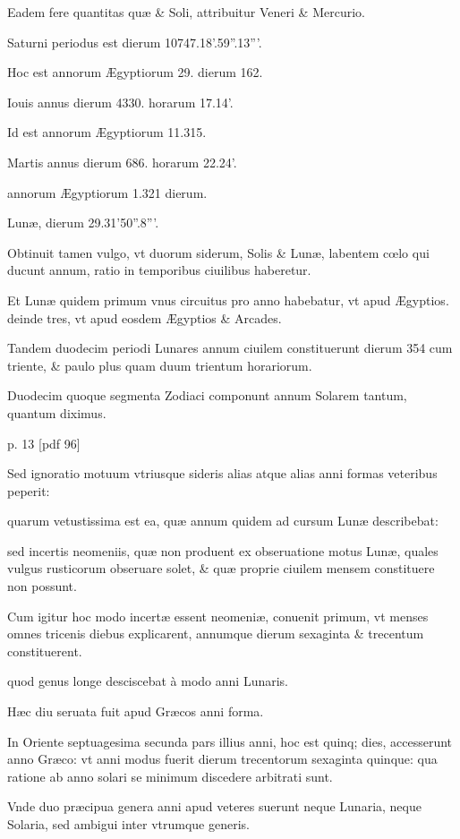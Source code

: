 Eadem fere quantitas quæ \& Soli, attribuitur Veneri \& Mercurio.

Saturni periodus est dierum 10747.18'.59''.13'''.

Hoc est annorum
Ægyptiorum 29. dierum 162.

Iouis annus dierum 4330. horarum 17.14'.

Id est annorum Ægyptiorum 11.315.

Martis annus dierum
686. horarum 22.24'.

annorum Ægyptiorum 1.321 dierum.

Lunæ,
dierum 29.31'50''.8'''.

Obtinuit tamen vulgo, vt duorum siderum,
Solis \& Lunæ, labentem cœlo qui ducunt annum, ratio in  temporibus
ciuilibus haberetur.

Et Lunæ quidem primum vnus circuitus
pro anno habebatur, vt apud Ægyptios. deinde tres, vt apud eosdem
Ægyptios \& Arcades.

Tandem duodecim periodi Lunares annum
ciuilem constituerunt dierum 354 cum triente, \& paulo plus quam
duum trientum horariorum.

Duodecim quoque segmenta Zodiaci
componunt annum Solarem tantum, quantum diximus.



p. 13 [pdf 96]


Sed ignoratio
motuum vtriusque sideris alias atque alias anni formas veteribus
peperit:

quarum vetustissima est ea, quæ annum quidem ad cursum
Lunæ describebat:

sed incertis neomeniis, quæ non produent ex obseruatione
motus Lunæ, quales vulgus rusticorum obseruare solet, \&
quæ proprie ciuilem mensem constituere non possunt.

Cum igitur
hoc modo incertæ essent neomeniæ, conuenit primum, vt menses omnes
tricenis diebus explicarent, annumque dierum sexaginta \& trecentum
constituerent.

quod genus longe desciscebat à modo anni
Lunaris.

Hæc diu seruata fuit apud Græcos anni forma.

In Oriente
septuagesima secunda pars illius anni, hoc est quinq; dies, accesserunt
anno Græco: vt anni modus fuerit dierum trecentorum sexaginta quinque:
qua ratione ab anno solari se minimum discedere arbitrati sunt.

Vnde duo præcipua genera anni apud veteres suerunt neque Lunaria,
neque Solaria, sed ambigui inter vtrumque generis.

